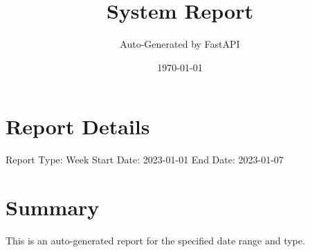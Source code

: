 \documentclass{article}%
\title{System Report}%
\author{Auto{-}Generated by FastAPI}%
\date{\today}%
\begin{document}
%
\normalsize%
\maketitle%
\section{Report Details}%
\label{sec:ReportDetails}%
Report Type: Week\newline%
%
Start Date: 2023{-}01{-}01\newline%
%
End Date: 2023{-}01{-}07\newline%

%
\section{Summary}%
\label{sec:Summary}%
This is an auto{-}generated report for the specified date range and type.

%
\end{document}
